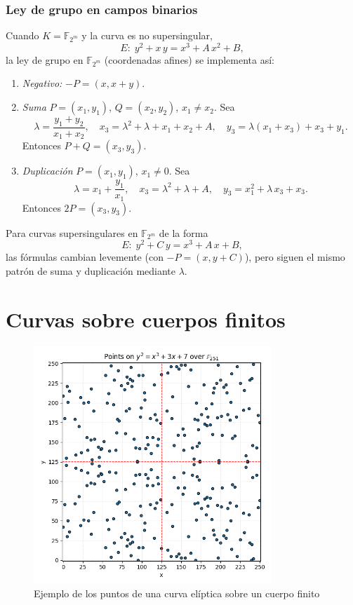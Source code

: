 \subsubsection*{Ley de grupo en campos binarios}

Cuando \(K = \mathbb{F}_{2^m}\) y la curva es no supersingular,
\[
  E\colon\;y^2 + x\,y = x^3 + A\,x^2 + B,
\]
la ley de grupo en \(\mathbb{F}_{2^m}\) (coordenadas afines) se implementa así:

\begin{enumerate}
  \item \emph{Negativo:} \(-P = (x,x+y)\).
  \item \emph{Suma} \(P=(x_1,y_1)\), \(Q=(x_2,y_2)\), \(x_1\neq x_2\). Sea
    \[
      \lambda = \frac{y_1 + y_2}{x_1 + x_2},\quad
      x_3 = \lambda^2 + \lambda + x_1 + x_2 + A,\quad
      y_3 = \lambda(x_1 + x_3) + x_3 + y_1.
    \]
    Entonces \(P + Q = (x_3,y_3)\).
  \item \emph{Duplicación} \(P=(x_1,y_1)\), \(x_1\neq0\). Sea
    \[
      \lambda = x_1 + \frac{y_1}{x_1},\quad
      x_3 = \lambda^2 + \lambda + A,\quad
      y_3 = x_1^2 + \lambda\,x_3 + x_3.
    \]
    Entonces \(2P = (x_3,y_3)\).
\end{enumerate}

Para curvas supersingulares en \(\mathbb{F}_{2^m}\) de la forma
\[
  E\colon\;y^2 + C\,y = x^3 + A\,x + B,
\]
las fórmulas cambian levemente (con \(-P=(x,y+C)\)), pero siguen el mismo patrón de suma y duplicación mediante \(\lambda\).

\section{Curvas sobre cuerpos finitos}\label{sec:curvas_sobre_cuerpos_finitos}
\begin{figure}[H]
    \centering
    \includegraphics[width=0.8\textwidth]{imagenes/points_finite_field_251.png}
    \caption{Ejemplo de los puntos de una curva elíptica sobre un cuerpo finito}
    \label{fig:points_finite_field_251}
\end{figure}

